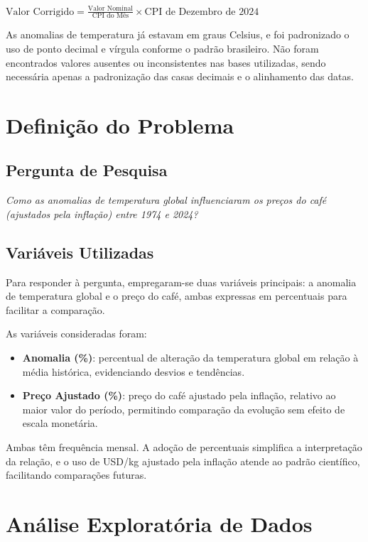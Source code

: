 \documentclass[12pt]{article}
\begin{document}
\begin{center}
$\displaystyle \text{Valor~Corrigido} = \frac{\text{Valor~Nominal}}{\text{CPI~do~Mês}} \times \text{CPI~de~Dezembro~de~2024}$
\end{center}

As anomalias de temperatura já estavam em graus Celsius, e foi padronizado o uso de ponto decimal e vírgula conforme o padrão brasileiro. Não foram encontrados valores ausentes ou inconsistentes nas bases utilizadas, sendo necessária apenas a padronização das casas decimais e o alinhamento das datas.

\section{Definição do Problema}
\subsection{Pergunta de Pesquisa}
\textit{Como as anomalias de temperatura global influenciaram os preços do café (ajustados pela inflação) entre 1974 e 2024?}

\subsection{Variáveis Utilizadas}
Para responder à pergunta, empregaram-se duas variáveis principais: a anomalia de temperatura global e o preço do café, ambas expressas em percentuais para facilitar a comparação.

As variáveis consideradas foram:

\begin{itemize}
  \item \textbf{Anomalia (\%)}: percentual de alteração da temperatura global em relação à média histórica, evidenciando desvios e tendências.
  \item \textbf{Preço Ajustado (\%)}: preço do café ajustado pela inflação, relativo ao maior valor do período, permitindo comparação da evolução sem efeito de escala monetária.
\end{itemize}

Ambas têm frequência mensal. A adoção de percentuais simplifica a interpretação da relação, e o uso de USD/kg ajustado pela inflação atende ao padrão científico, facilitando comparações futuras.

\section{Análise Exploratória de Dados}
\end{document}
